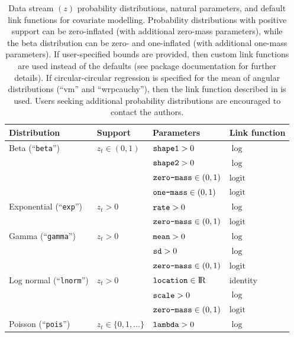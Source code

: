 \documentclass[12pt]{article}
\begin{document}
\begin{table}
  \caption{\label{tab:pdfs} Data stream $(z)$ probability distributions, natural parameters, and default link functions for covariate modelling. Probability distributions with positive support can be zero-inflated (with additional zero-mass parameters), while the beta distribution can be zero- and one-inflated (with additional one-mass parameters). If user-specified bounds are provided, then custom link functions are used instead of the defaults (see package documentation for further details). If circular-circular regression is specified for the mean of angular distributions (``vm'' and ``wrpcauchy''), then the link function described in \cite{DuchesneEtAl2015} is used. Users seeking additional probability distributions are encouraged to contact the authors.}
  \begin{tabular}{llll}
  \toprule
  Distribution & Support & Parameters & Link function \tabularnewline
  \midrule
  Beta (``\verb|beta|'')               & $z_t\in(0,1)$            & $\verb|shape1|>0$                &  $\log$ \tabularnewline  
                                       &                          & $\verb|shape2|>0$                &  $\log$ \tabularnewline
                                       &                          & $\verb|zero-mass|\in(0,1)$       &  $\text{logit}$ \tabularnewline 
                                       &                          & $\verb|one-mass|\in(0,1)$        &  $\text{logit}$ \tabularnewline 
  Exponential (``\verb|exp|'')         & $z_t>0$                  & $\verb|rate|>0$                  &  $\log$ \tabularnewline  
                                       &                          & $\verb|zero-mass|\in(0,1)$       &  $\text{logit}$ \tabularnewline 
  Gamma (``\verb|gamma|'')             & $z_t>0$                  & $\verb|mean|>0$                  &  $\log$ \tabularnewline  
                                       &                          & $\verb|sd|>0$                    &  $\log$ \tabularnewline  
                                       &                          & $\verb|zero-mass|\in(0,1)$       &  $\text{logit}$ \tabularnewline 
  Log normal (``\verb|lnorm|'')        & $z_t>0$                  & $\verb|location|\in{\rm I\!R}$   &  identity \tabularnewline  
                                       &                          & $\verb|scale|>0$                 &  $\log$ \tabularnewline  
                                       &                          & $\verb|zero-mass|\in(0,1)$       &  $\text{logit}$ \tabularnewline 
  Poisson (``\verb|pois|'')            & $z_t\in\{0,1,\ldots\}$   & $\verb|lambda|>0$                &  $\log$ \tabularnewline  

\end{tabular}
\end{table}
\end{document}

